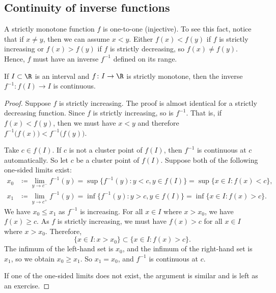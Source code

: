 \subsection{Continuity of inverse functions}


A strictly monotone function $f$ is one-to-one (injective).
To see this fact,
notice that if $x \not= y$, then we can assume $x < y$.  Either $f(x) <
f(y)$ if $f$ is strictly increasing or $f(x) > f(y)$ if $f$ is strictly
decreasing, so $f(x) \not= f(y)$.
Hence, $f$ must have an inverse $f^{-1}$ defined on its range.

\begin{prop} \label{prop:invcont}
If $I \subset \R$ is an interval and $f \colon I \to \R$ is strictly
monotone, then the inverse $f^{-1} \colon f(I) \to I$ is continuous.
\end{prop}

\begin{proof}
Suppose $f$ is strictly increasing.  The proof is almost
identical for a strictly decreasing function.
Since $f$ is strictly increasing, so is $f^{-1}$.  That is, if $f(x) <
f(y)$, then we must have $x < y$ and therefore
$f^{-1}\bigl(f(x)\bigr) < f^{-1}\bigl(f(y)\bigr)$.

Take $c \in f(I)$.
If $c$ is not a cluster point of $f(I)$, then $f^{-1}$ is continuous at $c$
automatically.  So let $c$ be a cluster point of $f(I)$.
Suppose both of the following one-sided limits exist:
\begin{align*}
x_0 & \coloneqq \lim_{y \to c^-} f^{-1}(y) =
\sup \bigl\{ f^{-1}(y) : y < c, y \in f(I) \bigr\}
=
\sup \bigl\{ x \in I : f(x) < c \bigr\} , \\
x_1 & \coloneqq \lim_{y \to c^+} f^{-1}(y) =
\inf \bigl\{ f^{-1}(y) : y > c, y \in f(I) \bigr\}
=
\inf \bigl\{ x \in I : f(x) > c \bigr\} .
\end{align*}
We have $x_0 \leq x_1$ as $f^{-1}$ is increasing.
For all $x \in I$ where $x > x_0$, we have $f(x) \geq c$.  As $f$ is strictly increasing,
we must have $f(x) > c$ for all $x \in I$ where $x > x_0$.  Therefore,
\begin{equation*}
\{ x \in I : x > x_0 \} \subset \bigl\{ x \in I : f(x) > c \bigr\}.
\end{equation*}
The infimum of the left-hand set is $x_0$, and the infimum of the right-hand
set is $x_1$, so we obtain $x_0 \geq x_1$.
So $x_1 = x_0$, and $f^{-1}$ is continuous at $c$.

If one of the one-sided limits does not exist, the argument is similar
and is left as an exercise.
\end{proof}

